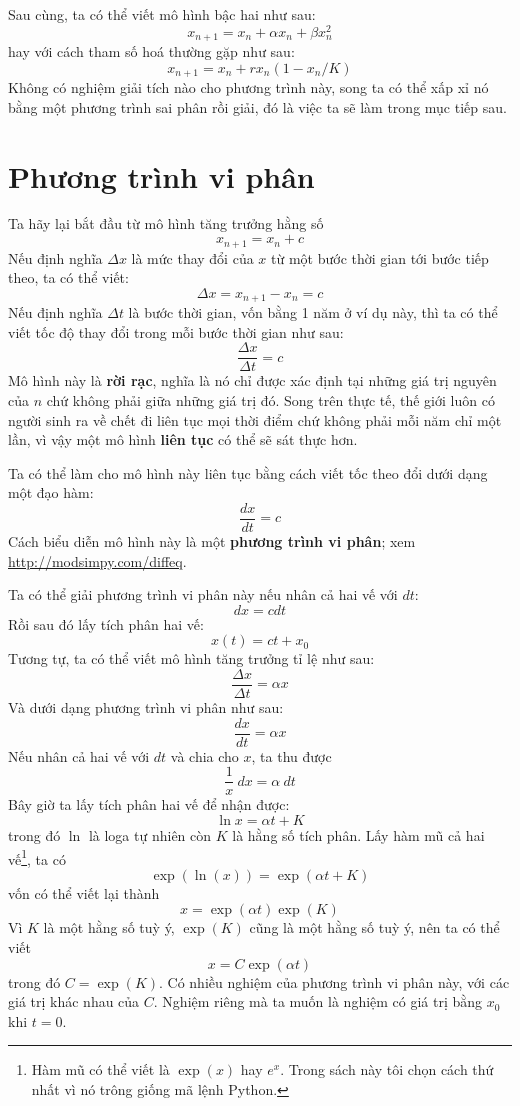 \documentclass[12pt]{book}
\theoremstyle{exercise}
\begin{document}

Sau cùng, ta có thể viết mô hình bậc hai như sau:
%
\[ x_{n+1} = x_n + \alpha x_n + \beta x_n^2 \]
%
hay với cách tham số hoá thường gặp như sau:
%
\[ x_{n+1} = x_n + r x_n (1 - x_n / K) \]
%
Không có nghiệm giải tích nào cho phương trình này, song ta có thể xấp xỉ nó bằng một phương trình sai phân rồi giải, đó là việc ta sẽ làm trong mục tiếp sau.


\section{Phương trình vi phân}
\label{diffeq}

Ta hãy lại bắt đầu từ mô hình tăng trưởng hằng số
%
\[ x_{n+1} = x_n + c \]
%
Nếu định nghĩa $\Delta x$ là mức thay đổi của $x$ từ một bước thời gian tới bước tiếp theo, ta có thể viết:
%
\[ \Delta x = x_{n+1} - x_n = c \]
%
Nếu định nghĩa $\Delta t$ là bước thời gian, vốn bằng 1 năm ở ví dụ này, thì ta có thể viết tốc độ thay đổi trong mỗi bước thời gian như sau:
%
\[ \frac{\Delta x}{\Delta t} = c \]
%
Mô hình này là {\bf rời rạc}, nghĩa là nó chỉ được xác định tại những giá trị nguyên của $n$ chứ không phải giữa những giá trị đó. Song trên thực tế, thế giới luôn có người sinh ra về chết đi liên tục mọi thời điểm chứ không phải mỗi năm chỉ một lần, vì vậy một mô hình {\bf liên tục} có thể sẽ sát thực hơn.


Ta có thể làm cho mô hình này liên tục bằng cách viết tốc theo đổi dưới dạng một đạo hàm:
%
\[ \frac{dx}{dt} = c \]
%
Cách biểu diễn mô hình này là một {\bf phương trình vi phân}; xem \url{http://modsimpy.com/diffeq}.


Ta có thể giải phương trình vi phân này nếu nhân cả hai vế với $dt$:
%
\[ dx = c dt \]
%
Rồi sau đó lấy tích phân hai vế:
%
\[ x(t) = c t + x_0 \]
%
Tương tự, ta có thể viết mô hình tăng trưởng tỉ lệ như sau:
%
\[ \frac{\Delta x}{\Delta t} = \alpha x \]
%
Và dưới dạng phương trình vi phân như sau:
%
\[ \frac{dx}{dt} = \alpha x \]
%
Nếu nhân cả hai vế với $dt$ và chia cho $x$, ta thu được
%
\[ \frac{1}{x}~dx = \alpha~dt \] 
%
Bây giờ ta lấy tích phân hai vế để nhận được:
%
\[ \ln x = \alpha t + K \]
%
trong đó $\ln$ là loga tự nhiên còn $K$ là hằng số tích phân. Lấy hàm mũ cả hai vế\footnote{Hàm mũ có thể viết là  $\exp(x)$ hay $e^x$.  Trong sách này tôi chọn cách thứ nhất vì nó trông giống mã lệnh Python. }, ta có
%
\[ \exp(\ln(x)) = \exp(\alpha t + K) \]
%
vốn có thể viết lại thành
%
\[ x = \exp(\alpha t) \exp(K) \]
%
Vì $K$ là một hằng số tuỳ ý, $\exp(K)$ cũng là một hằng số tuỳ ý, nên ta có thể viết
%
\[ x = C \exp(\alpha t) \]
%
trong đó $C = \exp(K)$.  Có nhiều nghiệm của phương trình vi phân này, với các giá trị khác nhau của $C$.  Nghiệm riêng mà ta muốn là nghiệm có giá trị bằng $x_0$ khi $t=0$. 
\end{document}
